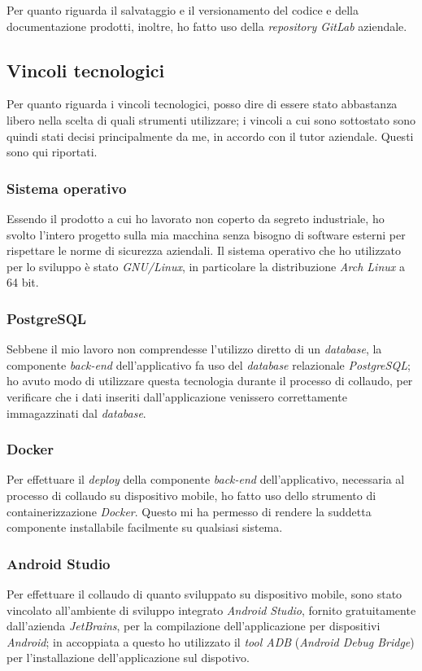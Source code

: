 Per quanto riguarda il salvataggio e il versionamento del codice e della documentazione prodotti, inoltre, ho fatto uso della \textit{repository GitLab} aziendale.

\subsection{Vincoli tecnologici}

Per quanto riguarda i vincoli tecnologici, posso dire di essere stato abbastanza libero nella scelta di quali strumenti utilizzare; i vincoli a cui sono sottostato sono quindi stati decisi principalmente da me, in accordo con il tutor aziendale. Questi sono qui riportati.

\subsubsection*{Sistema operativo}

Essendo il prodotto a cui ho lavorato non coperto da segreto industriale, ho svolto l'intero progetto sulla mia macchina senza bisogno di software esterni per rispettare le norme di sicurezza aziendali. Il sistema operativo che ho utilizzato per lo sviluppo è stato \textit{GNU/Linux}, in particolare la distribuzione \textit{Arch Linux} a 64 bit.

\subsubsection*{PostgreSQL}
Sebbene il mio lavoro non comprendesse l'utilizzo diretto di un \textit{database}, la componente \textit{back-end} dell'applicativo fa uso del \textit{database} relazionale \textit{PostgreSQL}; ho avuto modo di utilizzare questa tecnologia durante il processo di collaudo, per verificare che i dati inseriti dall'applicazione venissero correttamente immagazzinati dal \textit{database}.

\subsubsection*{Docker}
Per effettuare il \textit{deploy} della componente \textit{back-end} dell'applicativo, necessaria al processo di collaudo su dispositivo mobile, ho fatto uso dello strumento di containerizzazione \textit{Docker}. Questo mi ha permesso di rendere la suddetta componente installabile facilmente su qualsiasi sistema.

\subsubsection*{Android Studio}
Per effettuare il collaudo di quanto sviluppato su dispositivo mobile, sono stato vincolato all'ambiente di sviluppo integrato \textit{Android Studio}, fornito gratuitamente dall'azienda \textit{JetBrains}, per la compilazione dell'applicazione per dispositivi \textit{Android}; in accoppiata a questo ho utilizzato il \textit{tool ADB} (\textit{Android Debug Bridge}) per l'installazione dell'applicazione sul dispotivo.


